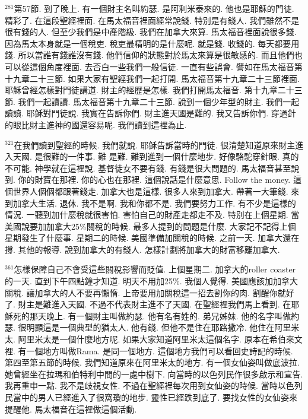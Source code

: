 \documentclass{book}
\begin{document}
$^{281}$第57節.
到了晚上.
有一個財主名叫約瑟.
是阿利米泰來的.
他也是耶穌的門徒.
精彩了.
在這段聖經裡面.
在馬太福音裡面經常說錢.
特別是有錢人.
我們雖然不是很有錢的人.
但至少我們是中產階級.
我們在加拿大來算.
馬太福音裡面說很多錢.
因為馬太本身就是一個稅吏.
稅吏最精明的是什麼呢.
就是錢.
收錢的.
每天都要用錢.
所以當誰有錢誰沒有錢.
他們信仰的狀態對於馬太來算是很敏感的.
而且他們也可以從這個角度裡面.
去否白一些我們一般信徒.
一直有些誤會.
譬如在馬太福音第十九章二十三節.
如果大家有聖經我們一起打開.
馬太福音第十九章二十三節裡面.
耶穌曾經怎樣對門徒講道.
財主的經歷是怎樣.
我們打開馬太福音.
第十九章二十三節.
我們一起讀讀.
馬太福音第十九章二十三節.
說到一個少年型的財主.
我們一起讀讀.
耶穌對門徒說.
我實在告訴你們.
財主進天國是難的.
我又告訴你們.
穿過針的眼比財主進神的國還容易呢.
我們讀到這裡為止.

$^{321}$在我們讀到聖經的時候.
我們就說.
耶穌告訴當時的門徒.
很清楚知道原來財主進入天國.
是很難的一件事.
難 是難.
難到進到一個什麼地步.
好像駱駝穿針眼.
真的不可能.
神學就在這裡說.
基督徒女不要有錢.
有錢是很大問題的.
馬太福音甚至說到.
你的財寶在那裡.
你的心也在那裡.
這個說話是什麼意思.
Follow the money.
這個世界人個個都跟著錢走.
加拿大也是這樣.
很多人來到加拿大.
帶著一大筆錢.
來到加拿大生活.
退休.
我不是啊.
我和你都不是.
我們要努力工作.
有不少是這樣的情況.
一聽到加什麼稅就很害怕.
害怕自己的財產走都走不及.
特別在上個星期.
當美國說要加加拿大25\%關稅的時候.
最多人提到的問題是什麼.
大家記不記得上個星期發生了什麼事.
星期二的時候.
美國準備加關稅的時候.
之前一天.
加拿大還在撐.
其他的報導.
說到加拿大的有錢人.
怎樣計劃將加拿大的財富移離加拿大.

$^{361}$怎樣保障自己不會受這些關稅影響而貶值.
上個星期二.
加拿大的roller coaster的一天.
直到下午四點鐘才知道.
明天不用加25\%.
我個人覺得.
美國應該加加拿大關稅.
讓加拿大的人不要再懶惰.
上帝要用加關稅這一招去割你的肉.
割醒你就好了.
財主是難進入天國.
不過不代表財主進不了天國.
在聖經裡我們馬上看到.
在耶穌死的那天晚上.
有一個財主叫做約瑟.
他有名有姓的.
弟兄姊妹.
他的名字叫做約瑟.
很明顯這是一個典型的猶太人.
他有錢.
但他不是住在耶路撒冷.
他住在阿里米太.
阿里米太是一個什麼地方呢.
如果大家知道阿里米太這個名字.
原本在希伯來文裡.
有一個地方叫做Rama.
是同一個地方.
這個地方我們可以看回史詩記的時候.
第四至第五節的時候.
我們知道原來在阿里米太的地方.
有一個女仙姿叫做底波拉.
她曾經坐在拉瑪和伯特利中間的一處中樹下.
向當時的以色列民作很多啟示和宣告.
我再重申一點.
我不是歧視女性.
不過在聖經裡每次用到女仙姿的時候.
當時以色列民當中的男人已經進入了很窩瓊的地步.
靈性已經跌到底了.
要找女性的女仙姿來提醒他.
馬太福音在這裡做這個活動.
\end{document}
